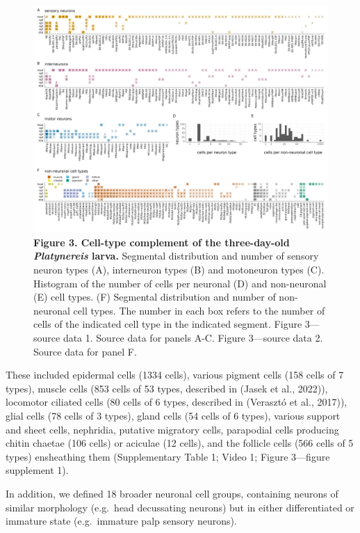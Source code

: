 \documentclass[
  11pt,
]{article}
\begin{document}
\begin{figure}[H]

{\centering \includegraphics[width=1\textwidth,height=\textheight]{Figures/Figure3.png}

}

\caption{\textbf{Figure 3. Cell-type complement of the three-day-old
\emph{Platynereis} larva.} Segmental distribution and number of sensory
neuron types (A), interneuron types (B) and motoneuron types (C).
Histogram of the number of cells per neuronal (D) and non-neuronal (E)
cell types. (F) Segmental distribution and number of non-neuronal cell
types. The number in each box refers to the number of cells of the
indicated cell type in the indicated segment. Figure 3---source data 1.
Source data for panels A-C. Figure 3---source data 2. Source data for
panel F.}

\end{figure}%

These included epidermal cells (1334 cells), various pigment cells (158
cells of 7 types), muscle cells (853 cells of 53 types, described in
(Jasek et al., 2022)), locomotor ciliated cells (80 cells of 6 types,
described in (Verasztó et al., 2017)), glial cells (78 cells of 3
types), gland cells (54 cells of 6 types), various support and sheet
cells, nephridia, putative migratory cells, parapodial cells producing
chitin chaetae (106 cells) or aciculae (12 cells), and the follicle
cells (566 cells of 5 types) ensheathing them (Supplementary Table 1;
Video 1; Figure 3---figure supplement 1).

In addition, we defined 18 broader neuronal cell groups, containing
neurons of similar morphology (e.g.~head decussating neurons) but in
either differentiated or immature state (e.g.~immature palp sensory
neurons).
\end{document}
